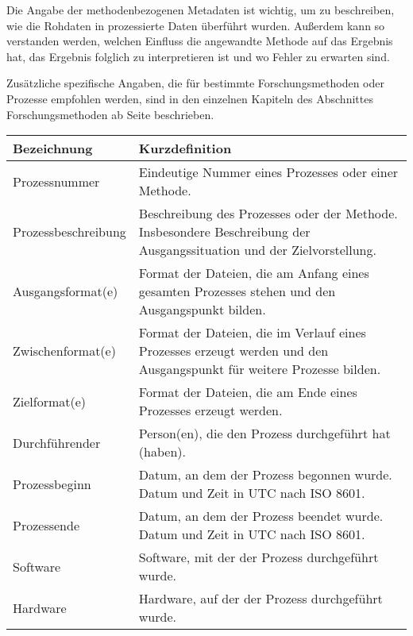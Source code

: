 Die Angabe der methodenbezogenen Metadaten ist wichtig, um zu beschreiben, wie die Rohdaten in prozessierte Daten überführt wurden. Außerdem kann so verstanden werden, welchen Einfluss die angewandte Methode auf das Ergebnis hat, das Ergebnis folglich zu interpretieren ist und wo Fehler zu erwarten sind.

Zusätzliche spezifische Angaben, die für bestimmte Forschungsmethoden oder Prozesse empfohlen werden, sind in den einzelnen Kapiteln des Abschnittes Forschungsmethoden ab Seite \pageref{methoden} beschrieben.

\begin{center}
	\begin{tabular}{L{0.25\textwidth} p{0.68\textwidth}}
		\toprule
		Bezeichnung & Kurzdefinition\\ \midrule
		Prozessnummer & Eindeutige Nummer eines Prozesses oder einer Methode.\\
		Prozessbeschreibung & Beschreibung des Prozesses oder der Methode. Insbesondere Beschreibung der Ausgangssituation und der Zielvorstellung.\\
		Ausgangsformat(e) & Format der Dateien, die am Anfang eines gesamten Prozesses stehen und den Ausgangspunkt bilden.\\
		Zwischenformat(e) & Format der Dateien, die im Verlauf eines Prozesses erzeugt werden und den Ausgangspunkt für weitere Prozesse bilden.\\
		Zielformat(e) & Format der Dateien, die am Ende eines Prozesses erzeugt werden.\\
		Durchführender & Person(en), die den Prozess durchgeführt hat (haben).\\
		Prozessbeginn & Datum, an dem der Prozess begonnen wurde. Datum und Zeit in UTC nach ISO 8601.\\
		Prozessende & Datum, an dem der Prozess beendet wurde. Datum und Zeit in UTC nach ISO 8601.\\
		Software & Software, mit der der Prozess durchgeführt wurde.\\
		Hardware & Hardware, auf der der Prozess durchgeführt wurde.\\
 		\bottomrule
		\bottomrule
	\end{tabular}
\end{center}


\label{grabungsdokumentation}
